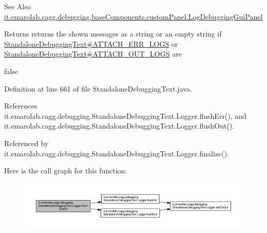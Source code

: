  \begin{DoxySeeAlso}{See Also}
\hyperlink{classit_1_1emarolab_1_1cagg_1_1debugging_1_1baseComponents_1_1customPanel_1_1LogDebuggingGuiPanel}{it.\-emarolab.\-cagg.\-debugging.\-base\-Components.\-custom\-Panel.\-Log\-Debugging\-Gui\-Panel}
\end{DoxySeeAlso}
\begin{DoxyReturn}{Returns}
returns the shown messages as a string or an empty string if \hyperlink{classit_1_1emarolab_1_1cagg_1_1debugging_1_1StandaloneDebuggingText_a3c7f740a83d97241fa0ec2964f466884}{Standalone\-Debugging\-Text\#\-A\-T\-T\-A\-C\-H\-\_\-\-E\-R\-R\-\_\-\-L\-O\-G\-S} or \hyperlink{classit_1_1emarolab_1_1cagg_1_1debugging_1_1StandaloneDebuggingText_a096b28d2f3e1c71e7f3d039559ea91a3}{Standalone\-Debugging\-Text\#\-A\-T\-T\-A\-C\-H\-\_\-\-O\-U\-T\-\_\-\-L\-O\-G\-S} are
\begin{DoxyCode}
\textcolor{keyword}{false} 
\end{DoxyCode}
 
\end{DoxyReturn}


Definition at line 661 of file Standalone\-Debugging\-Text.\-java.



References it.\-emarolab.\-cagg.\-debugging.\-Standalone\-Debugging\-Text.\-Logger.\-flush\-Err(), and it.\-emarolab.\-cagg.\-debugging.\-Standalone\-Debugging\-Text.\-Logger.\-flush\-Out().



Referenced by it.\-emarolab.\-cagg.\-debugging.\-Standalone\-Debugging\-Text.\-Logger.\-finalize().



Here is the call graph for this function\-:
\nopagebreak
\begin{figure}[H]
\begin{center}
\leavevmode
\includegraphics[width=350pt]{classit_1_1emarolab_1_1cagg_1_1debugging_1_1StandaloneDebuggingText_1_1Logger_a3834949691767f27ea4913df27751b10_cgraph}
\end{center}
\end{figure}


